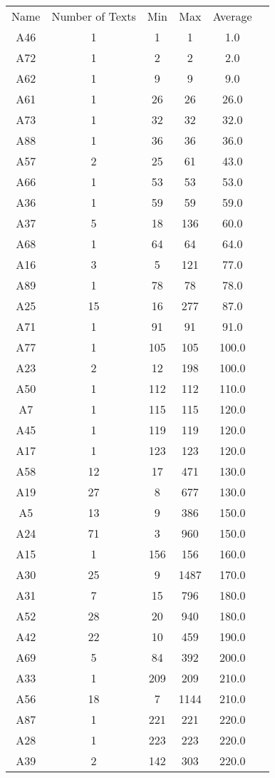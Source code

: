 \begin{tabular}{cccccc}
Name & Number of Texts & Min & Max & Average\\
A46 & 1 & 1 & 1 & 1.0\\
A72 & 1 & 2 & 2 & 2.0\\
A62 & 1 & 9 & 9 & 9.0\\
A61 & 1 & 26 & 26 & 26.0\\
A73 & 1 & 32 & 32 & 32.0\\
A88 & 1 & 36 & 36 & 36.0\\
A57 & 2 & 25 & 61 & 43.0\\
A66 & 1 & 53 & 53 & 53.0\\
A36 & 1 & 59 & 59 & 59.0\\
A37 & 5 & 18 & 136 & 60.0\\
A68 & 1 & 64 & 64 & 64.0\\
A16 & 3 & 5 & 121 & 77.0\\
A89 & 1 & 78 & 78 & 78.0\\
A25 & 15 & 16 & 277 & 87.0\\
A71 & 1 & 91 & 91 & 91.0\\
A77 & 1 & 105 & 105 & 100.0\\
A23 & 2 & 12 & 198 & 100.0\\
A50 & 1 & 112 & 112 & 110.0\\
A7 & 1 & 115 & 115 & 120.0\\
A45 & 1 & 119 & 119 & 120.0\\
A17 & 1 & 123 & 123 & 120.0\\
A58 & 12 & 17 & 471 & 130.0\\
A19 & 27 & 8 & 677 & 130.0\\
A5 & 13 & 9 & 386 & 150.0\\
A24 & 71 & 3 & 960 & 150.0\\
A15 & 1 & 156 & 156 & 160.0\\
A30 & 25 & 9 & 1487 & 170.0\\
A31 & 7 & 15 & 796 & 180.0\\
A52 & 28 & 20 & 940 & 180.0\\
A42 & 22 & 10 & 459 & 190.0\\
A69 & 5 & 84 & 392 & 200.0\\
A33 & 1 & 209 & 209 & 210.0\\
A56 & 18 & 7 & 1144 & 210.0\\
A87 & 1 & 221 & 221 & 220.0\\
A28 & 1 & 223 & 223 & 220.0\\
A39 & 2 & 142 & 303 & 220.0\\
\end{tabular}
